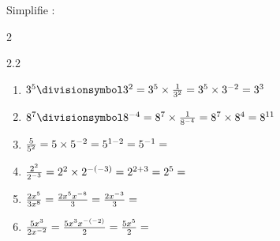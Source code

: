\documentclass[main.tex]{subfiles}
\begin{document}
%	  
\newpage 

 \begin{example} Simplifie :\hfill \vspace{-0.5em} 
 	\begin{multicols}{2}
	\begin{spacing}{2.2} 
		\begin{enumerate}[label={},leftmargin=*]
			\item $3^5\divisionsymbol 3^2=3^5\times \frac{1}{3^2}=3^5\times 3^{-2}=3^3$
			\item  $8^7\divisionsymbol 8^{-4}=8^7\times \frac{1}{8^{-4}}=8^7\times 8^{4}=8^{11}$ 
			\item  $\frac{5}{5^2}=5\times 5^{-2}=5^{1-2}=5^{-1}=\dotfill$
			\item  $\frac{2^2}{2^{-3}}=2^2\times 2^{-(-3)}=2^{2+3}=2^{5}=\dotfill$
			\item  $\frac{2x^5}{3x^8}=\frac{2x^5x^{-8}}{3} =\frac{2x^{-3}}{3}=\dotfill$
			\item  $\frac{5x^3}{2x^{-2}}=\frac{5x^3x^{-(-2)}}{2} =\frac{5x^{5}}{2}=\dotfill$
		\end{enumerate}
	\end{spacing}	 \vspace{-1em} 
\end{multicols} 
\end{example}
\end{document}
